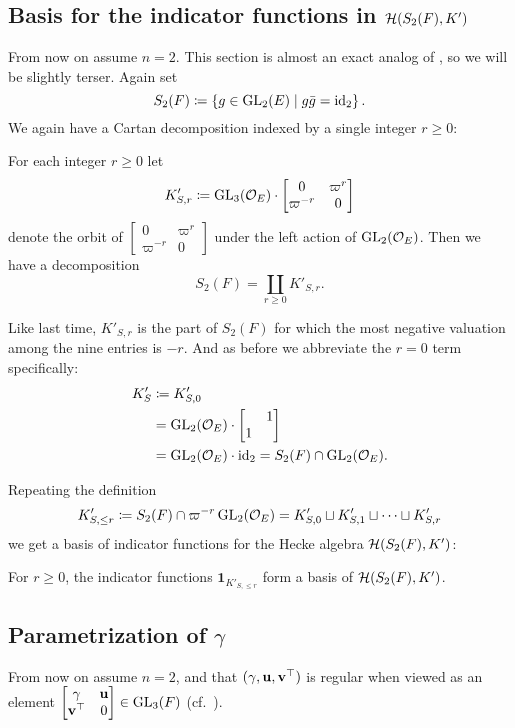 \subsection{Basis for the indicator functions in $\mathcal H(S_2(F), K')$}
From now on assume $n = 2$.
This section is almost an exact analog of ,
so we will be slightly terser.
Again set
\[ S_2(F) \coloneqq \left\{ g \in \operatorname{GL}_2(E) \mid g \bar{g} = \operatorname{id}_2 \right\}. \]
We again have a Cartan decomposition indexed by a single integer $r \ge 0$:
\begin{lemma}
  For each integer $r \ge 0$ let
  \[ K'_{S,r} \coloneqq \operatorname{GL}_3(\mathcal O_E) \cdot
    \begin{bmatrix} 0 & \varpi^r \\ \varpi^{-r} & 0 \end{bmatrix} \]
  denote the orbit of
  $\begin{bmatrix} 0 & \varpi^r \\ \varpi^{-r} & 0 \end{bmatrix}$
  under the left action of $\operatorname{GL}_2(\mathcal O_E)$.
  Then we have a decomposition
  \[ S_2(F) = \coprod_{r \geq 0} K'_{S,r}. \]
\end{lemma}
Like last time, $K'_{S,r}$ is the part of $S_2(F)$
for which the most negative valuation among the nine entries is $-r$.
And as before we abbreviate the $r = 0$ term specifically:
\begin{align*}
  K'_S
  &\coloneqq K'_{S,0} \\
  &= \operatorname{GL}_2(\mathcal O_E) \cdot \begin{bmatrix} & 1 \\ 1 \end{bmatrix} \\
  &= \operatorname{GL}_2(\mathcal O_E) \cdot \operatorname{id}_2 = S_2(F) \cap \operatorname{GL}_2(\mathcal O_E).
\end{align*}

Repeating the definition
\[ K'_{S, \le r} \coloneqq S_2(F) \cap \varpi^{-r} \operatorname{GL}_2(\mathcal O_E)
  = K'_{S,0} \sqcup K'_{S,1} \sqcup \dots \sqcup K'_{S,r} \]
we get a basis of indicator functions for the Hecke algebra $\mathcal H(S_2(F), K')$:
\begin{proposition}
  For $r \ge 0$, the indicator functions $\mathbf{1}_{K'_{S, \le r}}$
  form a basis of $\mathcal H(S_2(F), K')$.
\end{proposition}

\subsection{Parametrization of $\gamma$}
From now on assume $n = 2$,
and that $(\gamma, \mathbf u, \mathbf v^\top)$ is regular when viewed
as an element $\begin{bmatrix} \gamma & \mathbf u \\ \mathbf v^\top & 0 \end{bmatrix} \in \operatorname{GL}_3(F)$
(cf.\ ).


